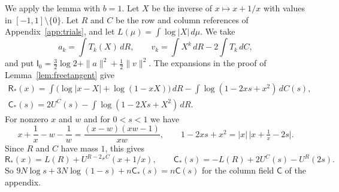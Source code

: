 \documentclass[11pt]{amsart}
\theoremstyle{definition}
\theoremstyle{remark}
\numberwithin{equation}{section}
\begin{document}
We apply the lemma with $b=1$. Let $X$ be the inverse of $x\mapsto x+1/x$ with values in $[-1,1]\setminus\{0\}$. Let $R$ and $C$ be the row and column references of Appendix~\ref{app:trials},
and let $L(\mu)=\int\log|X|\,d\mu$. We take
\[
 a_k=\int T_k(X)\,dR,\qquad v_k=\int X^k\,dR-2\int T_k\,dC,
\]
and put $\mathsf I_0=\frac32\log2+\|a\|^2+\frac12\|v\|^2$. The expansions in the proof of Lemma~\ref{lem:freetangent} give
\begin{gather*}
 \mathsf R_*(x)=\int\bigl(\log|x-X|+\log(1-xX)\bigr)\,dR-\int\log(1-2xs+x^2)\,dC(s),\\
 \mathsf C_*(s)=2U^C(s)-\int\log(1-2Xs+X^2)\,dR.
\end{gather*}
For nonzero $x$ and $w$ and for $0<s<1$ we have
\begin{equation}\label{eq:jouk}
 x+\frac1x-w-\frac1w=\frac{(x-w)(xw-1)}{xw},\qquad 1-2xs+x^2=|x|\,\bigl|x+\tfrac1x-2s\bigr|.
\end{equation}
Since $R$ and $C$ have mass $1$, this gives
\[
 \mathsf R_*(x)=L(R)+U^{R-2_\#C}(x+1/x),\qquad \mathsf C_*(s)=-L(R)+2U^C(s)-U^R(2s).
\]
So $9N\log s+3N\log(1-s)+n\mathsf C_*(s)=n\mathsf C(s)$ for the column field $\mathsf C$ of the appendix.
\end{document}
